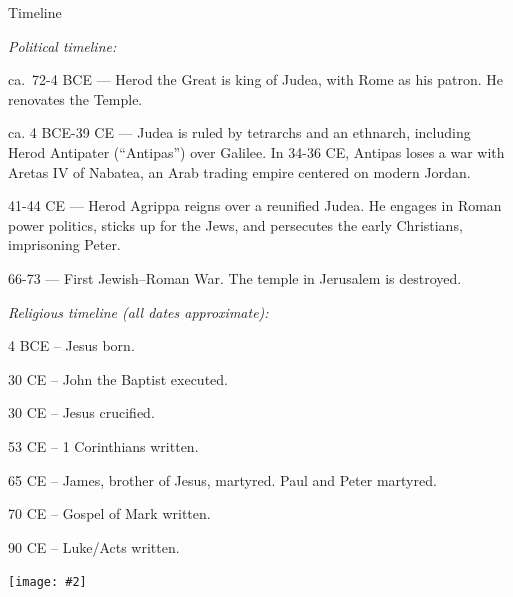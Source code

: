 \documentclass[10pt,twoside]{article} %
\newcommand{\fig}[2][0.4]{
    \ifthenelse{\isodd{\pageref{fig:#2}}}{}{\hfill}
    \texttt{[image: \#2]}\label{fig:#2}
    \ifthenelse{\isodd{\pageref{fig:#2}}}{\hfill}{}
    \par
}
\newcommand{\subhead}[1]{\emph{#1}\par}
\begin{document}
\begin{section}{Timeline}

\subhead{Political timeline:}

ca.~72-4 BCE --- Herod the Great is king of Judea, with Rome as his patron. He renovates the Temple.

ca. 4 BCE-39 CE --- Judea is ruled by tetrarchs and an ethnarch, including Herod Antipater (``Antipas'') over Galilee.
      In 34-36 CE, Antipas loses a war with Aretas IV of Nabatea, an Arab trading empire centered on modern Jordan.

41-44 CE --- Herod Agrippa reigns over a reunified Judea. He engages in Roman power politics, sticks up for the Jews,
      and persecutes the early Christians, imprisoning Peter.

66-73 --- First Jewish–Roman War. The temple in Jerusalem is destroyed.

\subhead{Religious timeline (all dates approximate):}

4 BCE -- Jesus born.

30 CE -- John the Baptist executed.

30 CE -- Jesus crucified.

53 CE -- 1 Corinthians written.

65 CE -- James, brother of Jesus, martyred. Paul and Peter martyred.

70 CE -- Gospel of Mark written.

90 CE -- Luke/Acts written.

\end{section}

\vfill

\pagebreak

\fig{john-in-the-wilderness}
\end{document}
